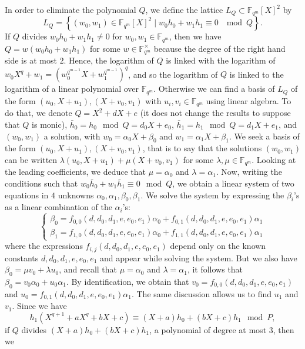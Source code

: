 \documentclass[a4paper,11pt]{article}
\theoremstyle{break}
\theoremstyle{sc}
\theoremstyle{definition}
\theoremstyle{remark}
\begin{document}
In order to eliminate the polynomial $Q$, we define the lattice $L_Q\subset
\mathbb{F}_{q^m}[X]^2$ by 
\[
  L_Q = \left\{ (w_0,
    w_1)\in\mathbb{F}_{q^m}[X]^2\;|\;w_0h_0+w_1h_1\equiv0\;\mod Q \right\}.
\]
If $Q$ divides $w_0h_0+w_1h_1\neq0$ for $w_0, w_1\in \mathbb{F}_{q^m}$, then we have
$Q = w(w_0h_0+w_1h_1)$ for some $w\in\mathbb{F}_{q^m}^\times$ because the degree
of the right hand side is at most $2$. Hence, the logarithm of $Q$ is linked
with the logarithm of $w_0X^q+w_1=(w_0^{q^{m-1}}X+w_1^{q^{m-1}})^q$, and so the
logarithm of $Q$ is linked to the logarithm of a linear
polynomial over $\mathbb{F}_{q^m}$. Otherwise we can find a basis of $L_Q$
of the form $(u_0, X+u_1), (X+v_0, v_1)$ with $u_i, v_i\in\mathbb{F}_{q^m}$
using linear algebra. To do that, we denote $Q = X^2 + dX+ e$ (it does not
change the results to suppose that $Q$ is monic), $\bar h_0 = h_0 \mod Q =
d_0X+e_0$, $\bar h_1 = h_1 \mod Q = d_1X+e_1$, and $(w_0, w_1)$ a solution, with
$w_0=\alpha_0X+\beta_0$ and $w_1=\alpha_1X+\beta_1$. We seek a basis of the form
$(u_0, X + u_1), (X+v_0, v_1)$, that is to say that the solutions $(w_0, w_1)$
can be written $\lambda(u_0, X+u_1)+\mu(X+v_0, v_1)$ for some $\lambda, \mu\in
\mathbb{F}_{q^m}$. Looking at the leading coefficients, we deduce that $\mu =
\alpha_0$ and $\lambda=\alpha_1$. Now, writing the conditions such that $w_0\bar
h_0+w_1\bar h_1\equiv 0 \mod Q$, we obtain a linear system of two equations in
$4$ unknowns $\alpha_0, \alpha_1, \beta_0, \beta_1$. We solve the system by
expressing the $\beta_i$'s as a linear combination of the $\alpha_i$'s:
\[
  \begin{cases}
    \beta_0 = f_{0,0}(d, d_0, d_1, e, e_0, e_1)\alpha_0 + f_{0,1}(d, d_0, d_1, e,
    e_0, e_1)\alpha_1 \\
    \beta_1 = f_{1,0}(d, d_0, d_1, e, e_0, e_1)\alpha_0 + f_{1,1}(d, d_0, d_1, e,
    e_0, e_1)\alpha_1 
  \end{cases}
\]
where the expressions $f_{i, j}(d, d_0, d_1, e, e_0, e_1)$ depend only on the
known constants $d, d_0, d_1, e, e_0, e_1$ and appear while solving the system. But we also have $\beta_0 = \mu v_0
+ \lambda u_0$, and recall that $\mu = \alpha_0$ and $\lambda = \alpha_1$, it
follows that $\beta_0 = v_0\alpha_0+u_0\alpha_1$. By identification, we obtain
that $v_0 = f_{0,0}(d, d_0, d_1, e, e_0, e_1)$ and $u_0 = f_{0,1}(d, d_0, d_1,
e, e_0, e_1)\alpha_1$. The same discussion allows us to find $u_1$ and $v_1$.
Since we have
\[
  h_1(X^{q+1}+aX^q+bX+c)\equiv(X+a)h_0+(bX+c)h_1\mod P,
\]
if $Q$ divides $(X+a)h_0+(bX+c)h_1$, a polynomial of degree at most $3$, then we
\end{document}
